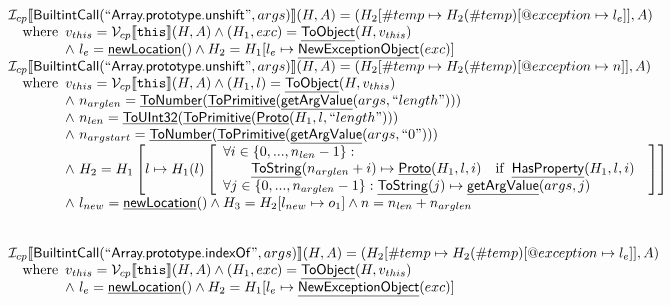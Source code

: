 \documentclass{article}
\makeatletter
\newcommand{\SF}[1]{\mbox{\textsf{#1}}}
\newcommand{\TT}[1]{\mbox{\texttt{#1}}}
\newcommand{\wherec}[1]{{\rm where}\begin{array}[t]{l}#1\end{array}}
\newcommand{\ifc}[1]{{\rm if}\begin{array}[t]{l}#1\end{array}}
\newcommand{\I}{\mathcal{I}}
\newcommand{\V}{\mathcal{V}}
\newcommand{\lbr}{\llbracket}
\newcommand{\rbr}{\rrbracket}
\newcommand{\hf}[1]{\underline{\sf #1}}
\newcommand{\varloc}[1]{\##1}
\newcommand{\varprop}[1]{@#1}
\makeatother
\begin{document}
\[
\begin{array}{l}

\I _{cp}\lbr \SF{BuiltintCall}(``\SF{Array.prototype.unshift}",args)\rbr(H,A)
 = (H_2[\varloc{temp}\mapsto H_2(\varloc{temp})[\varprop{exception}\mapsto l_e]], A) \\
\quad\wherec{
  v_{this} = \V _{cp}\lbr \TT{this}\rbr (H,A) \land (H_1,exc) = \hf{ToObject}(H,v_{this})\\
  \land\ l_e = \hf{newLocation}() \land H_2=H_1[l_e\mapsto\hf{NewExceptionObject}(exc)] 
  }\\

\I _{cp}\lbr \SF{BuiltintCall}(``\SF{Array.prototype.unshift}",args)\rbr(H,A)
 = (H_2[\varloc{temp}\mapsto H_2(\varloc{temp})[\varprop{exception}\mapsto n]], A) \\
\quad\wherec{
  v_{this} = \V _{cp}\lbr \TT{this}\rbr (H,A) \land (H_1,l) = \hf{ToObject}(H,v_{this})\\
  \land\ n_{arglen} = \hf{ToNumber}(\hf{ToPrimitive}(\hf{getArgValue}(args, ``length")))\\
  \land\ n_{len} = \hf{ToUInt32}(\hf{ToPrimitive}(\hf{Proto}(H_1, l, ``length")))\\
  \land\ n_{argstart} = \hf{ToNumber}(\hf{ToPrimitive}(\hf{getArgValue}(args, ``0")))\\
  \land\ H_2 = H_1\left[l \mapsto H_1(l)\left[
    \begin{array}{l}
      \forall i \in \{0,...,n_{len}-1\}:\\
        \quad\quad\hf{ToString}(n_{arglen}+i) \mapsto \hf{Proto}(H_1, l, i)
        \quad\ifc{\hf{HasProperty}(H_1,l,i)}\\
      \forall j \in \{0,...,n_{arglen}-1\}:\hf{ToString}(j) \mapsto \hf{getArgValue}(args,j)
    \end{array}
    \right]\right]\\
  \land\ l_{new} = \hf{newLocation}() \land H_3 = H_2[l_{new} \mapsto o_1] \land n = n_{len} + n_{arglen}
  }\\
\\\\



\I _{cp}\lbr \SF{BuiltintCall}(``\SF{Array.prototype.indexOf}",args)\rbr(H,A)
 = (H_2[\varloc{temp}\mapsto H_2(\varloc{temp})[\varprop{exception}\mapsto l_e]], A) \\
\quad\wherec{
  v_{this} = \V _{cp}\lbr \TT{this}\rbr (H,A) \land (H_1,exc) = \hf{ToObject}(H,v_{this})\\
  \land\ l_e = \hf{newLocation}() \land H_2=H_1[l_e\mapsto\hf{NewExceptionObject}(exc)] 
  }\\
  

\end{array}\]
\end{document}
